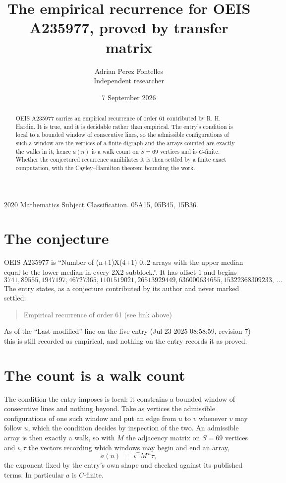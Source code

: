 \documentclass[11pt,a4paper]{article}
\title{The empirical recurrence for OEIS A235977, proved by transfer matrix}
\author{Adrian Perez Fontelles\\ \small Independent researcher}
\date{7 September 2026}
\theoremstyle{plain}
\theoremstyle{definition}
\begin{document}
\maketitle

\begin{abstract}
OEIS A235977 carries an empirical recurrence of order $61$ contributed by R. H. Hardin. It is
true, and it is decidable rather than empirical. The entry's condition is local to a bounded window of consecutive lines, so
the admissible configurations of such a window are the vertices of a finite digraph and the
arrays counted are exactly the walks in it; hence $a(n)$ is a walk count on $S=69$ vertices
and is $C$-finite. Whether the conjectured recurrence annihilates it is then settled by a
finite exact computation, with the Cayley--Hamilton theorem bounding the work.
\end{abstract}

\noindent\small 2020 Mathematics Subject Classification. 05A15, 05B45, 15B36.\normalsize

\section{The conjecture}

OEIS A235977 is ``Number of (n+1)X(4+1) 0..2 arrays with the upper median equal to the lower median in every 2X2 subblock.''. It has offset $1$ and begins
\[
3741, 89555, 1947197, 46727365, 1101519021, 26513929449, 636000634655, 15322368309233,\ \dots
\]
The entry states, as a conjecture contributed by its author and never marked settled:
\begin{quote}
Empirical recurrence of order 61 (see link above)
\end{quote}
As of the ``Last modified'' line on the live entry (Jul 23 2025 08:58:59, revision 7) this is still
recorded as empirical, and nothing on the entry records it as proved.

\section{The count is a walk count}

The condition the entry imposes is local: it constrains a bounded window of consecutive lines and nothing beyond. Take as
vertices the admissible configurations of one such window and put an edge from $u$ to $v$
whenever $v$ may follow $u$, which the condition decides by inspection of the two. An
admissible array is then exactly a walk, so with $M$ the adjacency matrix on $S=69$ vertices
and $\iota,\tau$ the vectors recording which windows may begin and end an array,
\[
a(n)\;=\;\iota^{\!\top}M^{\,n}\tau ,
\]
the exponent fixed by the entry's own shape and checked against its published terms. In
particular $a$ is $C$-finite.
\end{document}
